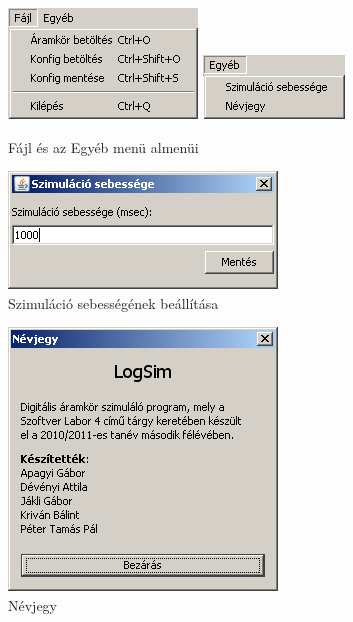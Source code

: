 \begin{figure}[H]
\begin{center}
\includegraphics[width=1.98in]{chapters/chapter11/screenshots/menus1.png}
\includegraphics[width=1.479in]{chapters/chapter11/screenshots/menus2.png}
\caption{Fájl és az Egyéb menü almenüi}
\label{fig:menus}
\end{center}
\end{figure}

\begin{figure}[H]
\begin{center}
\includegraphics[width=2.8125in]{chapters/chapter11/screenshots/szimseb.png}
\caption{Szimuláció sebességének beállítása}
\label{fig:szimseb}
\end{center}
\end{figure}

\begin{figure}[H]
\begin{center}
\includegraphics[width=2.8125in]{chapters/chapter11/screenshots/about.png}
\caption{Névjegy}
\label{fig:about}
\end{center}
\end{figure}

